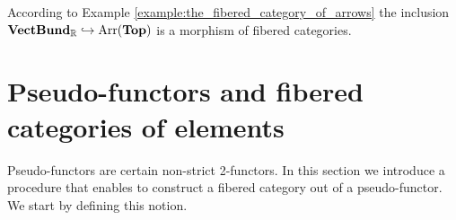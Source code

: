 \begin{example}
\begin{center}
\end{center}
According to Example \ref{example:the_fibered_category_of_arrows} the inclusion $\mathbf{VectBund}_{{\mathbb R}}\hookrightarrow \mathrm{Arr}(\mathbf{Top})$ is a morphism of fibered categories.
\end{example}

\section{Pseudo-functors and fibered categories of elements}
\noindent
Pseudo-functors are certain non-strict 2-functors. In this section we introduce a procedure that enables to construct a fibered category out of a pseudo-functor. We start by defining this notion.

